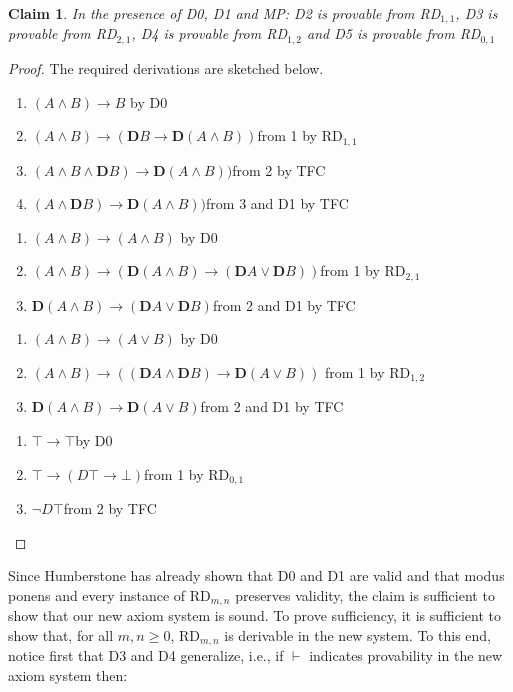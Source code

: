 \newtheorem*{claim}{Claim}
\begin{claim}
In the presence of D0, D1 and MP: D2 is provable from RD$_{1,1}$, D3 is provable from RD$_{2,1}$, D4 is provable from RD$_{1,2}$ and D5 is provable from RD$_{0,1}$ 
\end{claim}
\begin{proof}
The required derivations are sketched below.
\begin{enumerate}
\item{$ (A\wedge B)\rightarrow B$ \tab\tab\tab by D0}
\item{$ (A\wedge B)\rightarrow (\mathbf{D}B\rightarrow \mathbf{D}(A\wedge B))$\tab\tab from 1 by RD$_{1,1}$}
\item{$ (A\wedge B\wedge \mathbf{D}B)\rightarrow \mathbf{D}(A\wedge B))$\tab\tab from 2 by TFC}
\item{$(A\wedge \mathbf{D}B)\rightarrow \mathbf{D}(A\wedge B))$\tab\tab from 3 and D1 by TFC}
\end{enumerate}
\medskip
\begin{enumerate}
\item{$ (A\wedge B)\rightarrow (A\wedge B)$ \tab\tab\tab by D0}
\item{$(A\wedge B)\rightarrow (\mathbf{D}(A\wedge B)\rightarrow (\mathbf{D}A\vee \mathbf{D}B))$\tab from 1 by RD$_{2,1}$}
\item{$ \mathbf{D}(A\wedge B)\rightarrow (\mathbf{D}A\vee \mathbf{D}B)$\tab\tab from 2 and D1 by TFC}
\end{enumerate}
\medskip
\begin{enumerate}
\item{$ (A\wedge B)\rightarrow (A\vee B)$ \tab\tab\tab by D0}
\item{$ (A\wedge B)\rightarrow ((\mathbf{D}A\wedge \mathbf{D}B)\rightarrow \mathbf{D}(A\vee B))$ \tab from 1 by RD$_{1,2}$}
\item{$ \mathbf{D}(A\wedge B)\rightarrow \mathbf{D}(A\vee B)$\tab\tab from 2 and D1 by TFC}
\end{enumerate}
\medskip
\begin{enumerate}
\item{$ \top \rightarrow \top $\tab\tab\tab\tab by D0}
\item{$ \top \rightarrow (D\top \rightarrow \bot)$\tab\tab\tab from 1 by RD$_{0,1}$}
\item{$ \neg D\top $\tab\tab\tab\tab from 2 by TFC}
\end{enumerate}
\end{proof}
Since Humberstone has already shown that D0 and D1 are valid and that modus ponens and every instance of RD$_{m,n}$ preserves validity, the claim is sufficient to show that our new axiom system is sound. 
To prove sufficiency, it is sufficient to show that, for all $m,n\!\ge\!0$, RD$_{m,n}$ is derivable in the new system. To this end, notice first that D3 and D4 generalize, i.e., if $\vdash $ indicates provability in the new axiom system then:

